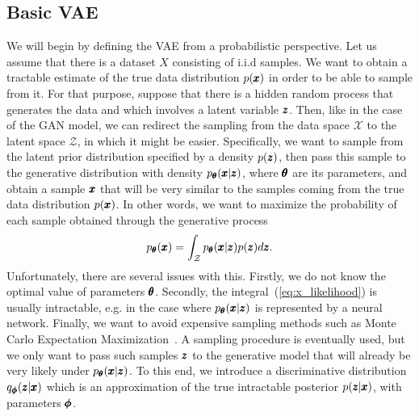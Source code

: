 \subsection{Basic VAE} \label{sec:vanilla_vae}
We will begin by defining the VAE from a probabilistic perspective. Let us assume that there is a dataset $X$ consisting of i.i.d samples. We want to obtain a tractable estimate of the true data distribution $p(\pmb{{x}})$ in order to be able to sample from it. For that purpose, suppose that there is a hidden random process that generates the data and which involves a latent variable $\pmb{{z}}$. Then, like in the case of the GAN model, we can redirect the sampling from the data space $\mathcal{X}$ to the latent space
$\mathcal{Z}$, in which it might be easier. Specifically, we want to sample from the latent prior distribution specified by a density $p(\pmb{{z}})$, then pass this sample to the generative distribution with density $p_{\pmb{{\theta}}}(\pmb{{x}}|\pmb{{z}})$, where $\pmb{{\theta}}$ are its parameters, and obtain a sample $\pmb{{x}}$ that will be very similar to the samples coming from the true data distribution $p(\pmb{{x}})$. In other words, we want to maximize the probability of each sample obtained through the generative process
\begin{equation}
p_{\pmb{{\theta}}}(\pmb{{x}})=\int_{\mathcal{Z}}p_{\pmb{{\theta}}}(\pmb{{x}}|\pmb{{z}})p(\pmb{{z}})d\pmb{{z}}.\label{eq:x_likelihood}
\end{equation}
Unfortunately, there are several issues with this. Firstly, we do not know the optimal value of parameters $\pmb{{\theta}}$. Secondly, the integral~(\ref{eq:x_likelihood}) is usually intractable, e.g. in the case where $p_{\pmb{{\theta}}}(\pmb{{x}}|\pmb{{z}})$ is represented by a neural network. Finally, we want to avoid expensive sampling methods such as Monte Carlo Expectation Maximization~\cite{levine2001implementations}. A sampling procedure is eventually used, but we only want to pass such samples $\pmb{{z}}$ to the generative model that will already be very likely under $p_{\pmb{{\theta}}}(\pmb{{x}}|\pmb{{z}})$. To this end, we introduce a discriminative distribution $q_{\pmb{{\phi}}}(\pmb{{z}}|\pmb{{x}})$ which is an approximation of the true intractable posterior $p(\pmb{{z}}|\pmb{{x}})$, with parameters $\pmb{{\phi}}$.

